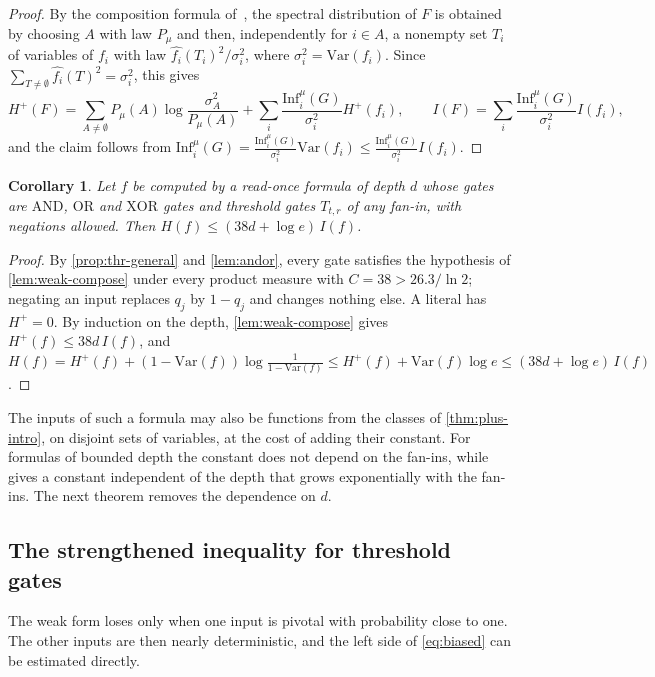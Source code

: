 \documentclass[11pt]{amsart}
\newtheorem{corollary}[theorem]{Corollary}
\theoremstyle{definition}
\theoremstyle{remark}
\newcommand{\Inf}{\mathrm{Inf}}
\newcommand{\Var}{\mathrm{Var}}
\begin{document}
\begin{proof}
By the composition formula of~\cite[Section~3]{OT13}, the spectral distribution of $F$ is obtained by choosing $A$
with law $P_\mu$ and then, independently for $i\in A$, a nonempty set $T_i$ of variables of $f_i$ with law
$\widehat{f_i}(T_i)^2/\sigma_i^2$, where $\sigma_i^2=\Var(f_i)$. Since $\sum_{T\ne\emptyset}\widehat{f_i}(T)^2=\sigma_i^2$,
this gives
\[
H^+(F)=\sum_{A\ne\emptyset}P_\mu(A)\log\frac{\sigma_A^2}{P_\mu(A)}+\sum_i\frac{\Inf_i^\mu(G)}{\sigma_i^2}H^+(f_i),\qquad
I(F)=\sum_i\frac{\Inf_i^\mu(G)}{\sigma_i^2}I(f_i),
\]
and the claim follows from $\Inf_i^\mu(G)=\frac{\Inf_i^\mu(G)}{\sigma_i^2}\Var(f_i)\le\frac{\Inf_i^\mu(G)}{\sigma_i^2}I(f_i)$.
\end{proof}

\begin{corollary}\label{cor:depth}
Let $f$ be computed by a read-once formula of depth $d$ whose gates are $\mathrm{AND}$, $\mathrm{OR}$ and $\mathrm{XOR}$
gates and threshold gates $T_{t,r}$ of any fan-in, with negations allowed. Then $H(f)\le(38d+\log e)\,I(f)$.
\end{corollary}

\begin{proof}
By \cref{prop:thr-general} and \cref{lem:andor}, every gate satisfies the hypothesis of \cref{lem:weak-compose} under
every product measure with $C=38>26.3/\ln2$; negating an input replaces $q_j$ by $1-q_j$ and changes nothing else. A
literal has $H^+=0$. By induction on the depth, \cref{lem:weak-compose} gives $H^+(f)\le38d\,I(f)$, and
$H(f)=H^+(f)+(1-\Var(f))\log\frac1{1-\Var(f)}\le H^+(f)+\Var(f)\log e\le(38d+\log e)\,I(f)$.
\end{proof}

The inputs of such a formula may also be functions from the classes of \cref{thm:plus-intro}, on disjoint sets of
variables, at the cost of adding their constant. For formulas of bounded depth the constant does not depend on the
fan-ins, while~\cite[Theorem~3]{OT13} gives a constant independent of the depth that grows exponentially with the
fan-ins. The next theorem removes the dependence on $d$.

\subsection*{The strengthened inequality for threshold gates}
The weak form loses only when one input is pivotal with probability close to one. The other inputs are then nearly
deterministic, and the left side of \eqref{eq:biased} can be estimated directly.
\end{document}
